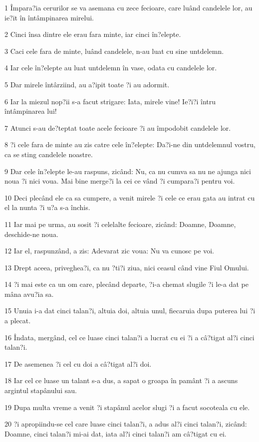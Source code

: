 \par 1 Împara?ia cerurilor se va asemana cu zece fecioare, care luând candelele lor, au ie?it în întâmpinarea mirelui.
\par 2 Cinci însa dintre ele erau fara minte, iar cinci în?elepte.
\par 3 Caci cele fara de minte, luând candelele, n-au luat cu sine untdelemn.
\par 4 Iar cele în?elepte au luat untdelemn în vase, odata cu candelele lor.
\par 5 Dar mirele întârziind, au a?ipit toate ?i au adormit.
\par 6 Iar la miezul nop?ii s-a facut strigare: Iata, mirele vine! Ie?i?i întru întâmpinarea lui!
\par 7 Atunci s-au de?teptat toate acele fecioare ?i au împodobit candelele lor.
\par 8 ?i cele fara de minte au zis catre cele în?elepte: Da?i-ne din untdelemnul vostru, ca se sting candelele noastre.
\par 9 Dar cele în?elepte le-au raspuns, zicând: Nu, ca nu cumva sa nu ne ajunga nici noua ?i nici voua. Mai bine merge?i la cei ce vând ?i cumpara?i pentru voi.
\par 10 Deci plecând ele ca sa cumpere, a venit mirele ?i cele ce erau gata au intrat cu el la nunta ?i u?a s-a închis.
\par 11 Iar mai pe urma, au sosit ?i celelalte fecioare, zicând: Doamne, Doamne, deschide-ne noua.
\par 12 Iar el, raspunzând, a zis: Adevarat zic voua: Nu va cunosc pe voi.
\par 13 Drept aceea, priveghea?i, ca nu ?ti?i ziua, nici ceasul când vine Fiul Omului.
\par 14 ?i mai este ca un om care, plecând departe, ?i-a chemat slugile ?i le-a dat pe mâna avu?ia sa.
\par 15 Unuia i-a dat cinci talan?i, altuia doi, altuia unul, fiecaruia dupa puterea lui ?i a plecat.
\par 16 Îndata, mergând, cel ce luase cinci talan?i a lucrat cu ei ?i a câ?tigat al?i cinci talan?i.
\par 17 De asemenea ?i cel cu doi a câ?tigat al?i doi.
\par 18 Iar cel ce luase un talant s-a dus, a sapat o groapa în pamânt ?i a ascuns argintul stapânului sau.
\par 19 Dupa multa vreme a venit ?i stapânul acelor slugi ?i a facut socoteala cu ele.
\par 20 ?i apropiindu-se cel care luase cinci talan?i, a adus al?i cinci talan?i, zicând: Doamne, cinci talan?i mi-ai dat, iata al?i cinci talan?i am câ?tigat cu ei.
